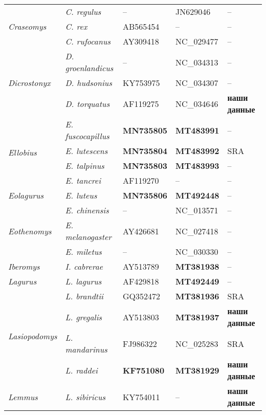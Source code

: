 \begin{landscape}
\begin{center}
\begin{longtable}{|p{3.5cm}|p{4.5cm}|p{4.0cm}|p{6.5cm}|p{4.5cm}|}
\multirow{3}{*}{\textit{Craseomys}} & \textit{C. regulus} & -- & JN629046 & -- \\ \cline{2-5}
& \textit{C. rex} & AB565454 & -- & --\\ \cline{2-5}
& \textit{C. rufocanus} & AY309418 & NC\_029477 & --\\ \hline
\multirow{3}{*}{\textit{Dicrostonyx}} & \textit{D. groenlandicus} & -- & NC\_034313 & --\\ \cline{2-5}
& \textit{D. hudsonius} & KY753975 & NC\_034307 & --\\ \cline{2-5}
& \textit{D. torquatus} & AF119275 & NC\_034646 & \textbf{наши данные}\\ \hline
\multirow{4}{*}{\textit{Ellobius}} & \textit{E. fuscocapillus} & \textbf{MN735805} & \textbf{MT483991} & --\\ \cline{2-5}
& \textit{E. lutescens} & \textbf{MN735804} & \textbf{MT483992} & SRA\\ \cline{2-5}
& \textit{E. talpinus} & \textbf{MN735803} & \textbf{MT483993} & --\\ \cline{2-5}
& \textit{E. tancrei} & AF119270 & -- & --\\ \hline
\textit{Eolagurus} & \textit{E. luteus} & \textbf{MN735806} & \textbf{MT492448} & --\\ \hline
\multirow{3}{*}{\textit{Eothenomys}} & \textit{E. chinensis} & -- & NC\_013571 & --\\ \cline{2-5}
& \textit{E. melanogaster} & AY426681 & NC\_027418 & --\\ \cline{2-5}
& \textit{E. miletus} & -- & NC\_030330 & --\\ \hline
\textit{Iberomys} & \textit{I. cabrerae} & AY513789 & \textbf{MT381938} & --\\ \hline
\textit{Lagurus} & \textit{L. lagurus} & AF429818 & \textbf{MT492449} & --\\ \hline
\multirow{4}{*}{\textit{Lasiopodomys}} & \textit{L. brandtii} & GQ352472 & \textbf{MT381936} & SRA\\ \cline{2-5}
& \textit{L. gregalis} & AY513803 & \textbf{MT381937} & \textbf{наши данные}\\ \cline{2-5}
& \textit{L. mandarinus} & FJ986322 & NC\_025283 & SRA\\ \cline{2-5}
& \textit{L. raddei} & \textbf{KF751080} & \textbf{MT381929} & \textbf{наши данные}\\ \hline
\multirow{2}{*}{\textit{Lemmus}} & \textit{L. sibiricus} & KY754011 & -- & \textbf{наши данные}\\ \cline{2-5}

\end{longtable}
\end{center}
\end{landscape}
